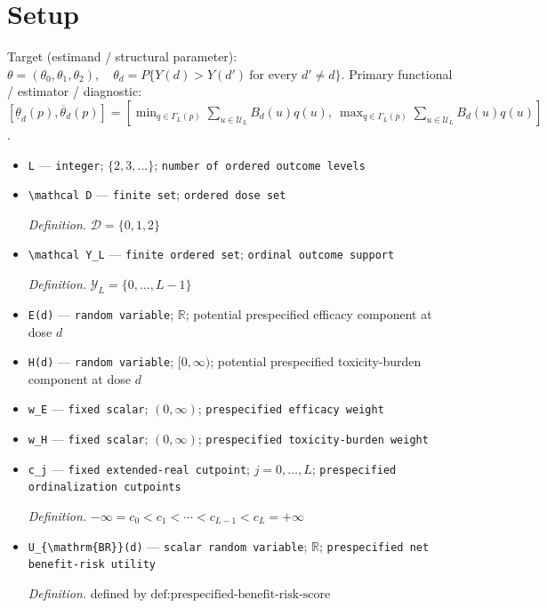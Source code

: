 \documentclass{article}
\begin{document}
\section{Setup}

Target (estimand / structural parameter): \(\theta=(\theta_0,\theta_1,\theta_2),\quad \theta_d=P\{Y(d)>Y(d')\ \text{for every }d'\ne d\}\).
Primary functional / estimator / diagnostic: \([\underline\theta_d(p),\overline\theta_d(p)]=[\min_{q\in\Gamma_L(p)}\sum_{u\in\mathcal U_L}B_d(u)q(u),\ \max_{q\in\Gamma_L(p)}\sum_{u\in\mathcal U_L}B_d(u)q(u)]\).
\begin{itemize}
  \item \texttt{L} --- \texttt{integer}; \(\{2,3,\ldots\}\); \texttt{number of ordered outcome levels}
  \item \texttt{\textbackslash{}\allowbreak{}mathcal D} --- \texttt{finite set}; \texttt{ordered dose set}
  \par\smallskip\noindent\emph{Definition.} \(\mathcal D=\{0,1,2\}\)
  \item \texttt{\textbackslash{}\allowbreak{}mathcal Y\_\allowbreak{}L} --- \texttt{finite ordered set}; \texttt{ordinal outcome support}
  \par\smallskip\noindent\emph{Definition.} \(\mathcal Y_L=\{0,\ldots,L-1\}\)
  \item \texttt{E(d)} --- \texttt{random variable}; \(\mathbb R\); potential prespecified efficacy component at dose \(d\)
  \item \texttt{H(d)} --- \texttt{random variable}; \([0,\infty)\); potential prespecified toxicity-burden component at dose \(d\)
  \item \texttt{w\_\allowbreak{}E} --- \texttt{fixed scalar}; \((0,\infty)\); \texttt{prespecified efficacy weight}
  \item \texttt{w\_\allowbreak{}H} --- \texttt{fixed scalar}; \((0,\infty)\); \texttt{prespecified toxicity-\allowbreak{}burden weight}
  \item \texttt{c\_\allowbreak{}j} --- \texttt{fixed extended-\allowbreak{}real cutpoint}; \(j=0,\ldots,L\); \texttt{prespecified ordinalization cutpoints}
  \par\smallskip\noindent\emph{Definition.} \(-\infty=c_0<c_1<\cdots<c_{L-1}<c_L=+\infty\)
  \item \texttt{U\_\allowbreak{}\{\textbackslash{}\allowbreak{}mathrm\{BR\}\allowbreak{}\}\allowbreak{}(d)} --- \texttt{scalar random variable}; \(\mathbb R\); \texttt{prespecified net benefit-\allowbreak{}risk utility}
  \par\smallskip\noindent\emph{Definition.} defined by \(\text{def:prespecified-benefit-risk-score}\)

\end{itemize}
\end{document}
